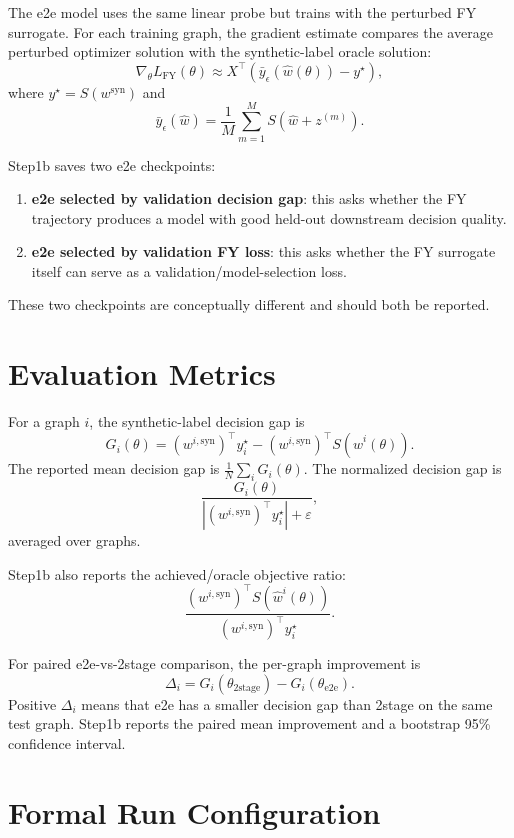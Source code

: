 The e2e model uses the same linear probe but trains with the perturbed FY
surrogate. For each training graph, the gradient estimate compares the average
perturbed optimizer solution with the synthetic-label oracle solution:
\[
    \nabla_{\theta} L_{\mathrm{FY}}(\theta)
    \approx
    X^\top
    \left(
        \bar y_\epsilon(\hat w(\theta)) - y^\star
    \right),
\]
where \(y^\star = S(w^{\mathrm{syn}})\) and
\[
    \bar y_\epsilon(\hat w)
    =
    \frac{1}{M}\sum_{m=1}^{M}
    S(\hat w + z^{(m)}).
\]

Step1b saves two e2e checkpoints:
\begin{enumerate}
    \item \textbf{e2e selected by validation decision gap}: this asks whether
    the FY trajectory produces a model with good held-out downstream decision
    quality.
    \item \textbf{e2e selected by validation FY loss}: this asks whether the FY
    surrogate itself can serve as a validation/model-selection loss.
\end{enumerate}

These two checkpoints are conceptually different and should both be reported.

\section{Evaluation Metrics}

For a graph \(i\), the synthetic-label decision gap is
\[
    G_i(\theta)
    =
    (w^{i,\mathrm{syn}})^\top y_i^\star
    -
    (w^{i,\mathrm{syn}})^\top S(\hat w^i(\theta)).
\]
The reported mean decision gap is \(\frac{1}{N}\sum_i G_i(\theta)\). The
normalized decision gap is
\[
    \frac{G_i(\theta)}
    {|(w^{i,\mathrm{syn}})^\top y_i^\star|+\varepsilon},
\]
averaged over graphs.

Step1b also reports the achieved/oracle objective ratio:
\[
    \frac{(w^{i,\mathrm{syn}})^\top S(\hat w^i(\theta))}
    {(w^{i,\mathrm{syn}})^\top y_i^\star}.
\]

For paired e2e-vs-2stage comparison, the per-graph improvement is
\[
    \Delta_i
    =
    G_i(\theta_{\mathrm{2stage}})
    -
    G_i(\theta_{\mathrm{e2e}}).
\]
Positive \(\Delta_i\) means that e2e has a smaller decision gap than 2stage on
the same test graph. Step1b reports the paired mean improvement and a bootstrap
95\% confidence interval.

\section{Formal Run Configuration}

